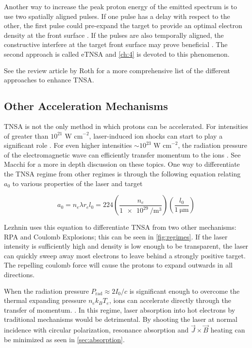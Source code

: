 Another way to increase the peak proton energy of the emitted spectrum is to use two spatially aligned pulses. If one pulse has a delay with respect to the other, the first pulse could pre-expand the target to provide an optimal electron density at the front surface \cite{Ferri_2018_PoP}. If the pulses are also temporally aligned, the constructive interfere at the target front surface may prove beneficial \cite{Ferri_2019_Nat_Comm}. The second approach is called \gls{eTNSA} and \cref{ch:4} is devoted to this phenomenon. 

See the review article by Roth \cite{Roth_2016_CERN_TNSA} for a more comprehensive list of the different approaches to enhance TNSA.

\subsection{Other Acceleration Mechanisms}
\gls{TNSA} is not the only method in which protons can be accelerated. For intensities of greater than $10^{21} \text{ W cm}^{-2}$, laser-induced ion shocks can start to play a significant role \cite{Fuchs_2005_Nat}. For even higher intensities $\sim 10^{23} \text{ W cm}^{-2}$, the radiation pressure of the electromagnetic wave can efficiently transfer momentum to the ions \cite{Fuchs_2005_Nat}. See Macchi \cite{Macchi_2013_RevModPhys} for a more in depth discussion on these topics. One way to differentiate the \gls{TNSA} regime from other regimes is through the following equation relating $a_0$ to various properties of the laser and target

\begin{equation}
	a_0 = n_e \lambda r_e l_0 = 224 \left(\frac{n_e}{\SI{1e29}{\per \meter \cubed}}\right) \left(\frac{l_0}{\SI{1}{\micro \meter}} \right) \label{eq:acc_regime}
\end{equation}

Lezhnin \cite{Lezhnin_2015_PoP} uses this equation to differentiate \gls{TNSA} from two other mechanisms: \gls{RPA} and Coulomb Explosions; this can be seen in \cref{fig:regimes}. If the laser intensity is sufficiently high and density is low enough to be transparent, the laser can quickly sweep away most electrons to leave behind a strongly positive target. The repelling coulomb force will cause the protons to expand outwards in all directions.

When the radiation pressure $P_\text{rad} \approx 2 I_0 / c$ is significant enough to overcome the thermal expanding pressure $n_e k_B T_e$, ions can accelerate directly through the transfer of momentum. \cite{Macchi_2013_RevModPhys}. In this regime, laser absorption into hot electrons by traditional mechanisms would be detrimental. By shooting the laser at normal incidence with circular polarization, resonance absorption and $\vec{J} \times \vec{B}$ heating can be minimized as seen in \cref{sec:absorption}.

